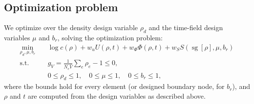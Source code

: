 \documentclass{article}
\begin{document}
\subsection{Optimization problem}
We optimize over the density design variable $\rho_d$ and the time-field design variables $\mu$ and $b_r$, solving the optimization problem:
\begin{align*}
    \min_{\rho_d,\mu,b_r}\quad & \log c(\rho) + w_u U(\rho, t) + w_\Phi \Phi(\rho, t) + w_S S\left(\operatorname{sg}[\rho], \mu, b_r\right) \\
    \text{s.t.}\quad           & g_V = \frac{1}{N_e \bar V}\sum_e \rho_e - 1 \le 0,                                                         \\
                               & 0 \le \rho_d \le 1, \quad 0 \le \mu \le 1, \quad 0 \le b_r \le 1,
\end{align*}
where the bounds hold for every element (or designed boundary node, for $b_r$), and $\rho$ and $t$ are computed from the design variables as described above.
\end{document}
